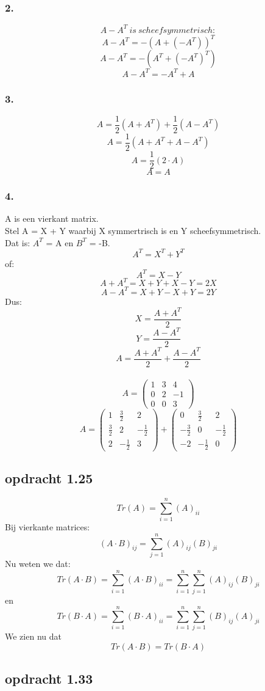 \documentclass[lineaire_algebra_oplossingen.tex]{subfiles}
\begin{document}
\subsubsection*{2.}
$$A - A^T \ is \ scheefsymmetrisch:$$
$$A - A^T = -(A+(-A^T))^T$$
$$A - A^T = -(A^T + (-A^T)^T)$$
$$A - A^T = -A^T + A$$
\subsubsection*{3.}
$$ A =  \frac{1}{2}(A + A^T) + \frac{1}{2}(A - A^T)$$
$$ A = \frac{1}{2}(A + A^T + A - A^T)$$
$$ A = \frac{1}{2}(2\cdot A)$$
$$ A = A$$
\subsubsection*{4.}
A is een vierkant matrix.\\
Stel A = X + Y waarbij X symmertrisch is en Y scheefsymmetrisch.\\
Dat is: $A^T$ = A en $B^T$ = -B.\\
$$A^T = X^T + Y^T$$
of: $$A^T = X - Y$$
$$A + A^T = X + Y + X - Y = 2X$$
$$A - A^T = X + Y - X + Y = 2Y$$
Dus:
$$X = \frac{A + A^T}{2}$$
$$Y = \frac{A - A^T}{2}$$
$$A = \frac{A + A^T}{2} + \frac{A - A^T}{2}$$
\\
$$
A = \begin{pmatrix}
1 & 3 & 4\\
0 & 2 & -1\\
0 & 0 & 3
\end{pmatrix}
$$
$$
A = \begin{pmatrix}
1 & \frac{3}{2} & 2\\
\frac{3}{2} & 2 & -\frac{1}{2}\\
2 & -\frac{1}{2} & 3
\end{pmatrix}
+
\begin{pmatrix}
0 & \frac{3}{2} & 2\\
-\frac{3}{2} & 0 & -\frac{1}{2}\\
-2 & -\frac{1}{2} & 0
\end{pmatrix}
$$
\subsection{opdracht 1.25}
\[
Tr(A) = \sum^{n}_{i=1}(A)_{ii}
\]
Bij vierkante matrices:
\[
(A\cdot B)_{ij} = \sum^{n}_{j=1}(A)_{ij}(B)_{ji}
\]
Nu weten we dat:
\[
Tr(A\cdot B) =\sum^{n}_{i=1}(A\cdot B)_{ii}=\sum^{n}_{i=1}\sum^{n}_{j=1}(A)_{ij}(B)_{ji}
\]
en
\[
Tr(B\cdot A) =\sum^{n}_{i=1}(B\cdot A)_{ii}=\sum^{n}_{i=1}\sum^{n}_{j=1}(B)_{ij}(A)_{ji}
\]
We zien nu dat
\[
Tr(A\cdot B) = Tr(B\cdot A)
\]

\subsection{opdracht 1.33}
\end{document}
